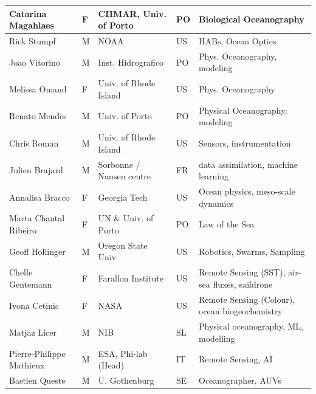 \begin{table}[H]
{\begin{tabular}{|p{3cm}|p{0.7cm}|p{4.0cm}|p{0.5cm}|p{6.5cm}|}
\hline
Catarina Magahlaes       & F   & CIIMAR, Univ. of Porto                & PO       & Biological Oceanography                         \\
\hline
Rick Stumpf              & M   & NOAA                                  & US       & HABs, Ocean Optics                              \\
\hline
Joao Vitorino            & M   & Inst. Hidrografico                    & PO       & Phys. Oceanography, modeling                    \\
\hline
Melissa Omand            & F   & Univ. of Rhode Island                 & US       & Phys. Oceanography                              \\
\hline
Renato Mendes            & M   & Univ. of Porto                        & PO       & Physical Oceanography, modeling                 \\
\hline
Chris Roman              & M   & Univ. of Rhode Island                 & US       & Sensors, instrumentation                        \\
\hline
Julien Brajard           & M   & Sorbonne / Nansen centre              & FR       & data assimilation, machine learning             \\
\hline
Annalisa Bracco          & F   & Georgia Tech                          & US       & Ocean physics, meso-scale dynamics              \\
\hline
Marta Chantal Ribeiro    & F   & UN \& Univ. of Porto                  & PO       & Law of the Sea                                  \\
\hline
Geoff Hollinger          & M   & Oregon State Univ                     & US       & Robotics, Swarms, Sampling                              \\
\hline
Chelle Gentemann         & F   & Farallon Institute                    & US       & Remote Sensing (SST), air-sea fluxes, saildrone \\
\hline
Ivona Cetinic            & F   & NASA                                  & US       & Remote Sensing (Colour), ocean biogeochemistry  \\
\hline
Matjaz Licer             & M   & NIB                                   & SL & Physical oceanography, ML, modelling            \\
\hline
Pierre-Philippe Mathieux & M   & ESA, Phi-lab (Head)                   & IT       & Remote Sensing, AI                              \\
\hline
Bastien Queste           & M   & U. Gothenburg                         & SE       & Oceanographer, AUVs\\                            

\end{tabular}}
\end{table}
